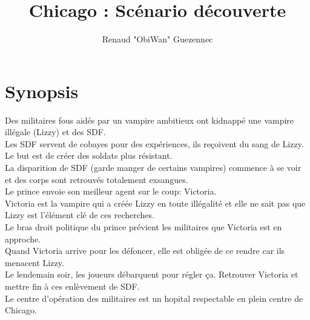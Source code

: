 \documentclass[oneside,12pt]{book}
\title{Chicago : Scénario découverte}
\author{Renaud "ObiWan" Guezennec}
\date{}
\begin{document}
\maketitle \clearpage
\tableofcontents \clearpage

\chapter{Synopsis}
Des militaires fous aidés par un vampire ambitieux ont kidnappé une vampire illégale (Lizzy) et des SDF. \\
Les SDF servent de cobayes pour des expériences, ils reçoivent du sang de Lizzy. Le but est de créer des soldats plus résistant.\\
La disparition de SDF (garde manger de certains vampires) commence à se voir et des corps sont retrouvés totalement exsangues.\\
Le prince envoie son meilleur agent sur le coup: Victoria. \\
Victoria est la vampire qui a créée Lizzy en toute illégalité et elle ne sait pas que Lizzy est l'élément clé de ces recherches.\\ 
Le bras droit politique du prince prévient les militaires que Victoria est en approche.\\
Quand Victoria arrive pour les défoncer, elle est obligée de ce rendre car ils menacent Lizzy. \\
Le lendemain soir, les joueurs débarquent pour régler ça. Retrouver Victoria et mettre fin à ces enlèvement de SDF.\\
Le centre d'opération des militaires est un hopital respectable en plein centre de Chicago.\\
\end{document}
